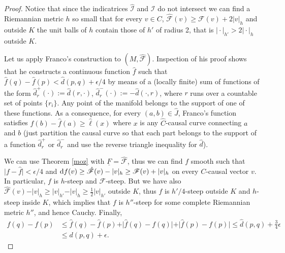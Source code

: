 \documentclass[a4paper]{jpconf}
\theoremstyle{definition}
\theoremstyle{remark}
\newcommand{\dd}{{\rm d}}
\begin{document}
\begin{proof}
Notice that since the indicatrices $\hat{\mathscr{I}}$ and $\mathscr{I}$ do not intersect we can find a Riemannian metric $h$ so small that for every $v\in  C$, $\hat{\mathscr{F}}(v)\ge {\mathscr{F}}(v)+2 \vert v\vert_h$ and outside $K$ the unit balls of $h$ contain those of $h'$ of radius 2, that is $\vert \cdot \vert_{h'}>2\vert \cdot \vert_{h}$ outside $K$.

Let us apply Franco's construction to $(M, \hat{\mathscr{F}})$. Inspection of his proof shows that he constructs a continuous function $\hat f$ such that $\hat f(q)-\hat f(p) <\hat{d}(p,q)+\epsilon/4$ by means of a (locally finite) sum of functions of the form $\hat{d}_r^+(\cdot):=\hat d(r,\cdot)$, $\hat{d}_r^-(\cdot):=-\hat d(\cdot, r)$, where $r$ runs over a countable set of points $\{r_i\}$. Any point of the manifold belongs to the support of one of these functions. As a consequence, for every $(a,b)\in \hat J$, Franco's function satisfies $\hat f(b)-\hat f(a)\ge  \hat\ell(x)$ where $x$ is any $\hat C$-causal curve connecting $a$ and $b$ (just partition the causal curve so that each part belongs to the support of a function $\hat{d}_r^+$ or $\hat{d}_r^-$ and use the reverse triangle inequality for $\hat d$).

We can use Theorem \ref{moz} with $\underline F=\hat{\mathscr{F}}$,  thus we can find $f$ smooth such that $\vert  f-\hat f\vert<\epsilon/4$ and $\dd  f(v) \ge \hat{\mathscr{F}}(v)-\vert v\vert_h\ge \mathscr{F}(v)+\vert v\vert_h$ on every $C$-causal vector $v$. In particular, $f$ is
$h$-steep and
$\mathscr{F}$-steep. But we have also  $\hat{\mathscr{F}}(v)-\vert v\vert_h\ge  \vert v\vert_{h'}-\vert v\vert_h \ge \frac{1}{2} \vert v\vert_{h'}$ outside $K$, thus  $f$  is $h'/4$-steep outside $K$ and  $h$-steep inside $K$, which implies that $f$ is $h''$-steep for some complete Riemannian metric $h''$, and hence Cauchy.
Finally,
\begin{align*}
 f(q)- f(p)&\le  \hat f(q)-\hat f(p)+\vert \hat f(q)-f(q)\vert + \vert \hat f(p)-f(p)\vert \le \hat{d}(p,q)+\tfrac{3}{4}\epsilon\\
&\le  {d}(p,q)+\epsilon.
\end{align*}
\end{proof}
\end{document}
